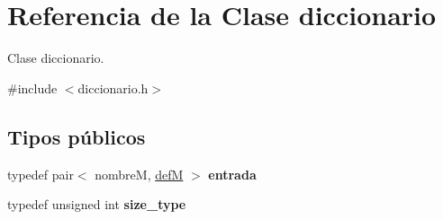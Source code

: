 \hypertarget{classdiccionario}{\section{Referencia de la Clase diccionario}
\label{classdiccionario}
}


Clase diccionario.  




{\ttfamily \#include $<$diccionario.\-h$>$}

\subsection*{Tipos públicos}
\begin{DoxyCompactItemize}
\item 
\hypertarget{classdiccionario_a6d02be0cdf21aeb28bdf44203a2c0e4e}{typedef pair$<$ nombre\-M, \hyperlink{classdefM}{def\-M} $>$ {\bfseries entrada}}\label{classdiccionario_a6d02be0cdf21aeb28bdf44203a2c0e4e}

\item 
\hypertarget{classdiccionario_aa5ebee53d922cfd46db90f11cac6da35}{typedef unsigned int {\bfseries size\-\_\-type}}\label{classdiccionario_aa5ebee53d922cfd46db90f11cac6da35}

\end{DoxyCompactItemize}
